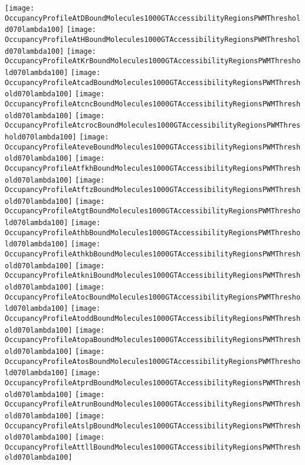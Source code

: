\documentclass[11pt]{article}
\begin{document}
 


\begin{center}
\texttt{[image: OccupancyProfileAtDBoundMolecules1000GTAccessibilityRegionsPWMThreshold070lambda100]}
\texttt{[image: OccupancyProfileAtHBoundMolecules1000GTAccessibilityRegionsPWMThreshold070lambda100]}
\texttt{[image: OccupancyProfileAtKrBoundMolecules1000GTAccessibilityRegionsPWMThreshold070lambda100]}
\texttt{[image: OccupancyProfileAtcadBoundMolecules1000GTAccessibilityRegionsPWMThreshold070lambda100]}
\texttt{[image: OccupancyProfileAtcncBoundMolecules1000GTAccessibilityRegionsPWMThreshold070lambda100]}
\texttt{[image: OccupancyProfileAtcrocBoundMolecules1000GTAccessibilityRegionsPWMThreshold070lambda100]}
\texttt{[image: OccupancyProfileAteveBoundMolecules1000GTAccessibilityRegionsPWMThreshold070lambda100]}
\texttt{[image: OccupancyProfileAtfkhBoundMolecules1000GTAccessibilityRegionsPWMThreshold070lambda100]}
\texttt{[image: OccupancyProfileAtftzBoundMolecules1000GTAccessibilityRegionsPWMThreshold070lambda100]}
\texttt{[image: OccupancyProfileAtgtBoundMolecules1000GTAccessibilityRegionsPWMThreshold070lambda100]}
\texttt{[image: OccupancyProfileAthbBoundMolecules1000GTAccessibilityRegionsPWMThreshold070lambda100]}
\texttt{[image: OccupancyProfileAthkbBoundMolecules1000GTAccessibilityRegionsPWMThreshold070lambda100]}
\texttt{[image: OccupancyProfileAtkniBoundMolecules1000GTAccessibilityRegionsPWMThreshold070lambda100]}
\texttt{[image: OccupancyProfileAtocBoundMolecules1000GTAccessibilityRegionsPWMThreshold070lambda100]}
\texttt{[image: OccupancyProfileAtoddBoundMolecules1000GTAccessibilityRegionsPWMThreshold070lambda100]}
\texttt{[image: OccupancyProfileAtopaBoundMolecules1000GTAccessibilityRegionsPWMThreshold070lambda100]}
\texttt{[image: OccupancyProfileAtosBoundMolecules1000GTAccessibilityRegionsPWMThreshold070lambda100]}
\texttt{[image: OccupancyProfileAtprdBoundMolecules1000GTAccessibilityRegionsPWMThreshold070lambda100]}
\texttt{[image: OccupancyProfileAtrunBoundMolecules1000GTAccessibilityRegionsPWMThreshold070lambda100]}
\texttt{[image: OccupancyProfileAtslpBoundMolecules1000GTAccessibilityRegionsPWMThreshold070lambda100]}
\texttt{[image: OccupancyProfileAttllBoundMolecules1000GTAccessibilityRegionsPWMThreshold070lambda100]}
\end{center}


\end{document}
